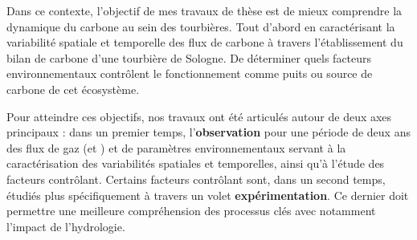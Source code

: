 %
%
%
%
%





Dans ce contexte, l'objectif de mes travaux de thèse est de mieux comprendre la dynamique du carbone au sein des tourbières.
Tout d'abord en caractérisant la variabilité spatiale et temporelle des flux de carbone à travers l'établissement du bilan de carbone d'une tourbière de Sologne.
De déterminer quels facteurs environnementaux contrôlent le fonctionnement comme puits ou source de carbone de cet écosystème.

Pour atteindre ces objectifs, nos travaux ont été articulés autour de deux axes principaux :
dans un premier temps, l'\textbf{observation} pour une période de deux ans des flux de gaz (\coo et \chh) et de paramètres environnementaux servant à la caractérisation des variabilités spatiales et temporelles, ainsi qu'à l'étude des facteurs contrôlant.
Certains facteurs contrôlant sont, dans un second temps, étudiés plus spécifiquement à travers un volet \textbf{expérimentation}.
Ce dernier doit permettre une meilleure compréhension des processus clés avec notamment l'impact de l'hydrologie.


